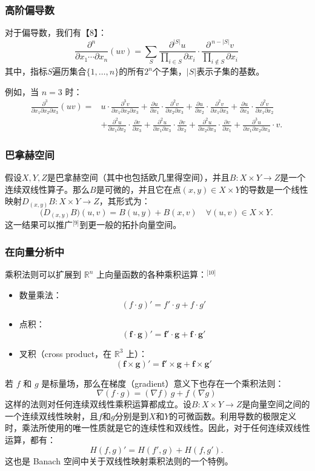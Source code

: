 \subsubsection{高阶偏导数}
对于偏导数，我们有【8】：
$$
\frac{\partial^{n}}{\partial x_{1}\cdots \partial x_{n}}(uv) 
= \sum_{S} 
\frac{\partial^{|S|}u}{\prod_{i\in S}\partial x_{i}}
\cdot
\frac{\partial^{\,n-|S|}v}{\prod_{i\notin S}\partial x_{i}}~
$$
其中，指标$S$遍历集合$\{1,\ldots,n\}$的所有$2^n$个子集，$|S|$表示子集的基数。

例如，当 $n=3$ 时：
$$
\begin{aligned}
\frac{\partial^{3}}{\partial x_{1}\partial x_{2}\partial x_{3}}(uv) 
={}& u \cdot \frac{\partial^{3}v}{\partial x_{1}\partial x_{2}\partial x_{3}}
+ \frac{\partial u}{\partial x_{1}} \cdot \frac{\partial^{2}v}{\partial x_{2}\partial x_{3}}
+ \frac{\partial u}{\partial x_{2}} \cdot \frac{\partial^{2}v}{\partial x_{1}\partial x_{3}}
+ \frac{\partial u}{\partial x_{3}} \cdot \frac{\partial^{2}v}{\partial x_{1}\partial x_{2}} \\
&+ \frac{\partial^{2}u}{\partial x_{1}\partial x_{2}} \cdot \frac{\partial v}{\partial x_{3}}
+ \frac{\partial^{2}u}{\partial x_{1}\partial x_{3}} \cdot \frac{\partial v}{\partial x_{2}}
+ \frac{\partial^{2}u}{\partial x_{2}\partial x_{3}} \cdot \frac{\partial v}{\partial x_{1}}
+ \frac{\partial^{3}u}{\partial x_{1}\partial x_{2}\partial x_{3}} \cdot v.
\end{aligned}~
$$
\subsubsection{巴拿赫空间}
假设$X, Y, Z$是巴拿赫空间（其中也包括欧几里得空间），并且$B : X \times Y \to Z$是一个连续双线性算子。那么$B$是可微的，并且它在点$(x, y)\in X \times Y$的导数是一个线性映射$D_{(x,y)}B : X \times Y \to Z$，其形式为：
$$
\bigl(D_{(x,y)}B\bigr)(u,v) = B(u,y) + B(x,v) \quad \forall (u,v)\in X\times Y.~
$$
这一结果可以推广\(^\text{[9]}\)到更一般的拓扑向量空间。
\subsubsection{在向量分析中}
乘积法则可以扩展到 $\mathbb{R}^n$ 上向量函数的各种乘积运算：\(^\text{[10]}\)
\begin{itemize}
\item 数量乘法：
$$
(f \cdot g)' = f' \cdot g + f \cdot g'~
$$
\item 点积：
$$
(\mathbf{f} \cdot \mathbf{g})' = \mathbf{f}' \cdot \mathbf{g} + \mathbf{f} \cdot \mathbf{g}'~
$$
\item 叉积（cross product，在 $\mathbb{R}^3$ 上）：
$$
(\mathbf{f} \times \mathbf{g})' = \mathbf{f}' \times \mathbf{g} + \mathbf{f} \times \mathbf{g}'~
$$
\end{itemize}
若 $f$ 和 $g$ 是标量场，那么在梯度（gradient）意义下也存在一个乘积法则：
$$
\nabla(f \cdot g) = (\nabla f)\, g + f \, (\nabla g)~
$$
这样的法则对任何连续双线性乘积运算都成立。设$B : X \times Y \to Z$是向量空间之间的一个连续双线性映射，且$f$和$g$分别是到$X$和$Y$的可微函数。利用导数的极限定义时，乘法所使用的唯一性质就是它的连续性和双线性。因此，对于任何连续双线性运算，都有：
$$
H(f,g)' = H(f', g) + H(f, g').~
$$
这也是 Banach 空间中关于双线性映射乘积法则的一个特例。
